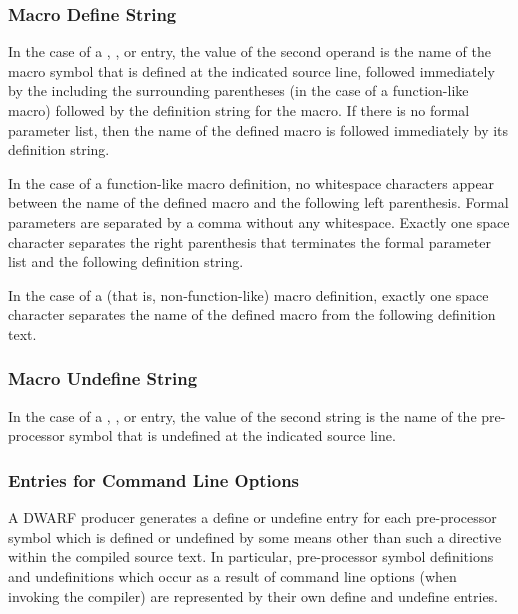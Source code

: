 \subsubsection{Macro Define String}
\label{chap:macrodefinestring}
In the case of a 
\DWMACROdefine{},
\DWMACROdefinestrp{},
\DWMACROdefinestrx{} or
\DWMACROdefinesup{}
entry, the value of the
second operand is the name of the macro symbol that is defined
at the indicated source line, followed immediately by the 
including the surrounding parentheses (in
the case of a function-like macro) followed by the definition
string for the macro. If there is no formal parameter list,
then the name of the defined macro is followed immediately by
its definition string.

In the case of a function-like macro definition, no whitespace
characters appear between the name of the defined
macro and the following left parenthesis. Formal parameters
are separated by a comma without any whitespace.
Exactly one space
character separates the right parenthesis that terminates
the formal parameter list and the following definition string.

In the case of a  (that is, non-function-like) macro
definition, exactly one space character separates the
name of the defined macro from the following definition text.

\subsubsection{Macro Undefine String}
\label{chap:macroundefinestring}
In the case of a 
\DWMACROundef{},
\DWMACROundefstrp{},
\DWMACROundefstrx{} or
\DWMACROundefsup{}
entry, the value of the second string is the name of the pre-processor
symbol that is undefined at the indicated source line.

\subsubsection{Entries for Command Line Options}
\label{chap:entriesforcommandlineoptions}
\DWMACROdefineINDX{}\DWMACROdefinestrpINDX{}\DWMACROdefinestrxINDX
\DWMACROundefINDX{}\DWMACROundefstrpINDX{}\DWMACROundefstrxINDX
A DWARF producer
generates a define or undefine entry for
each pre-processor symbol which is defined or undefined by
some means other than such a directive
within the compiled source text. In particular, pre-processor
symbol definitions and undefinitions which occur as a
result of command line options (when invoking the compiler)
are represented by their own define and
undefine entries.

